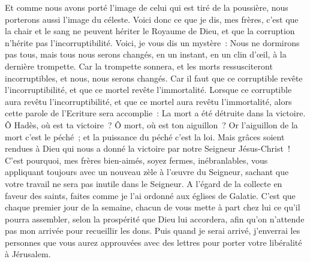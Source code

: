 \begin{multicols}{2}
Et comme nous avons porté l'image de celui qui est tiré de la poussière, nous porterons aussi l'image du céleste.
Voici donc ce que je dis, mes frères, c'est que la chair et le sang ne peuvent hériter le Royaume de Dieu, et que la corruption n'hérite pas l'incorruptibilité.
Voici, je vous dis un mystère~: Nous ne dormirons pas tous, mais tous nous serons changés,
en un instant, en un clin d'œil, à la dernière trompette. Car la trompette sonnera, et les morts ressusciteront incorruptibles, et nous, nous serons changés.
Car il faut que ce corruptible revête l'incorruptibilité, et que ce mortel revête l'immortalité.
Lorsque ce corruptible aura revêtu l'incorruptibilité, et que ce mortel aura revêtu l'immortalité, alors cette parole de l'Ecriture sera accomplie~: La mort a été détruite dans la victoire.
Ô Hadès, où est ta victoire~? Ô mort, où est ton aiguillon~?
Or l'aiguillon de la mort c'est le péché~; et la puissance du péché c'est la loi.
Mais grâces soient rendues à Dieu qui nous a donné la victoire par notre Seigneur Jésus-Christ~!
C'est pourquoi, mes frères bien-aimés, soyez fermes, inébranlables, vous appliquant toujours avec un nouveau zèle à l'œuvre du Seigneur, sachant que votre travail ne sera pas inutile dans le Seigneur.
\VerseOne{}A l'égard de la collecte en faveur des saints, faites comme je l'ai ordonné aux églises de Galatie.
C'est que chaque premier jour de la semaine, chacun de vous mette à part chez lui ce qu'il pourra assembler, selon la prospérité que Dieu lui accordera, afin qu'on n'attende pas mon arrivée pour recueillir les dons.
Puis quand je serai arrivé, j'enverrai les personnes que vous aurez approuvées avec des lettres pour porter votre libéralité à Jérusalem.

\end{multicols}

